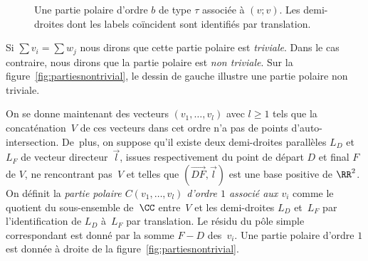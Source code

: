 \begin{figure}[htb]
\caption{Une partie polaire d'ordre $b$ de type $\tau$ associée à $(v;v)$. Les demi-droites dont les labels coïncident sont identifiés par translation.} \label{fig:ordreplusmoins}
\end{figure}

Si $\sum v_{i} =\sum w_{j}$ nous dirons que cette partie polaire est \emph{triviale}. Dans le cas contraire, nous dirons que la partie polaire est \emph{non triviale}. Sur la figure~\ref{fig:partiesnontrivial}, le dessin de gauche illustre une partie polaire non triviale.

On se donne maintenant des vecteurs $(v_{1},\dots,v_{l})$ avec $l\geq1$ tels que la concaténation~$V$ de ces vecteurs dans cet ordre n'a pas de points d'auto-intersection. De~plus, on suppose qu'il existe deux demi-droites parallèles $L_{D}$ et $L_{F}$ de vecteur directeur~$\overrightarrow{l}$, issues respectivement du point de départ $D$ et final $F$ de $V$, ne rencontrant pas~$V$ et telles que $(\overrightarrow{DF},\overrightarrow{l})$ est une base positive de $\RR^{2}$. On définit la \emph{partie polaire $C(v_{1},\dots,v_{l})$ d'ordre $1$ associé aux $v_{i}$} comme le quotient du sous-ensemble de~$\CC$ entre~$V$ et les demi-droites $L_{D}$ et~$L_{F}$ par l'identification de $L_{D}$ à~$L_{F}$ par translation. Le résidu du pôle simple correspondant est donné par la somme $F-D$ des~$v_{i}$. Une partie polaire d'ordre $1$ est donnée à droite de la figure~\ref{fig:partiesnontrivial}.


